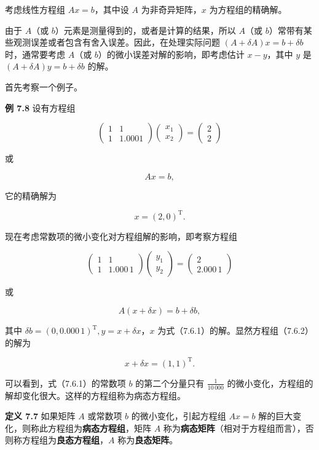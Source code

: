 \documentclass[
  10pt,
  fontset=fandol]{ctexart}
\begin{document}
考虑线性方程组 \(Ax=b\)，其中设 \(A\) 为非奇异矩阵，\(x\)
为方程组的精确解。

由于 \(A\)（或 \(b\)）元素是测量得到的，或者是计算的结果，所以 \(A\)（或
\(b\)）常带有某些观测误差或者包含有舍入误差。因此，在处理实际问题
\((A+\delta A)x=b+\delta b\) 时，通常要考虑 \(A\)（或
\(b\)）的微小误差对解的影响，即考虑估计 \(x-y\)，其中 \(y\) 是
\((A+\delta A)y=b+\delta b\) 的解。

首先考察一个例子。

\textbf{例 7.8} 设有方程组

\[
\begin{pmatrix}1&1\\1&1.0001\end{pmatrix}
\begin{pmatrix}x_1\\x_2\end{pmatrix}
=\begin{pmatrix}2\\2\end{pmatrix}
\]

或

\[
Ax=b,
\tag{7.6.1}
\]

它的精确解为

\[
x=(2,0)^{\mathrm T}.
\]

现在考虑常数项的微小变化对方程组解的影响，即考察方程组

\[
\begin{pmatrix}1&1\\1&1.000\,1\end{pmatrix}
\begin{pmatrix}y_1\\y_2\end{pmatrix}
=\begin{pmatrix}2\\2.000\,1\end{pmatrix}
\]

或

\[
A(x+\delta x)=b+\delta b,
\tag{7.6.2}
\]

其中 \(\delta b=(0,0.000\,1)^{\mathrm T},y=x+\delta x\)，\(x\)
为式（7.6.1）的解。显然方程组（7.6.2）的解为

\[
x+\delta x=(1,1)^{\mathrm T}.
\]

可以看到，式（7.6.1）的常数项 \(b\) 的第二个分量只有 \(\frac1{10\,000}\)
的微小变化，方程组的解却变化很大。这样的方程组称为病态方程组。

\textbf{定义 7.7} 如果矩阵 \(A\) 或常数项 \(b\) 的微小变化，引起方程组
\(Ax=b\) 解的巨大变化，则称此方程组为\textbf{病态方程组}，矩阵 \(A\)
称为\textbf{病态矩阵}（相对于方程组而言），否则称方程组为\textbf{良态方程组}，\(A\)
称为\textbf{良态矩阵}。
\end{document}
